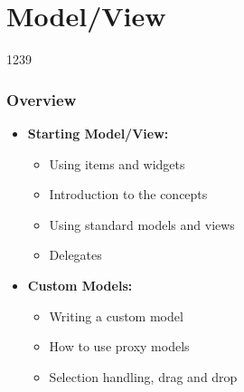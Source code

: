 %
%
%
%

\section{Model/View}

\begin{slide}{1239}
\label{model-view-programming}
\frametitle{Overview}

\begin{itemize}
\item \textbf{Starting Model/View:}
\begin{itemize}
\item Using items and widgets
\item Introduction to the concepts
\item Using standard models and views
\item Delegates
\end{itemize}
\item \textbf{Custom Models:}
\begin{itemize}
\item Writing a custom model
\item How to use proxy models
\item Selection handling, drag and drop
\end{itemize}
\end{itemize}

\end{slide}



% 
